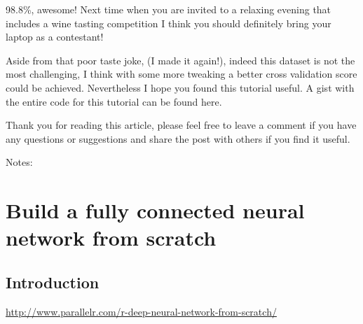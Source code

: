 \documentclass[]{book}
\begin{document}
98.8\%, awesome! Next time when you are invited to a relaxing evening that includes a wine tasting competition I think you should definitely bring your laptop as a contestant!

Aside from that poor taste joke, (I made it again!), indeed this dataset is not the most challenging, I think with some more tweaking a better cross validation score could be achieved. Nevertheless I hope you found this tutorial useful. A gist with the entire code for this tutorial can be found here.

Thank you for reading this article, please feel free to leave a comment if you have any questions or suggestions and share the post with others if you find it useful.

Notes:

\hypertarget{build-a-fully-connected-neural-network-from-scratch}{%
\chapter{Build a fully connected neural network from scratch}\label{build-a-fully-connected-neural-network-from-scratch}}

\hypertarget{introduction-2}{%
\section{Introduction}\label{introduction-2}}

\url{http://www.parallelr.com/r-deep-neural-network-from-scratch/}
\end{document}
